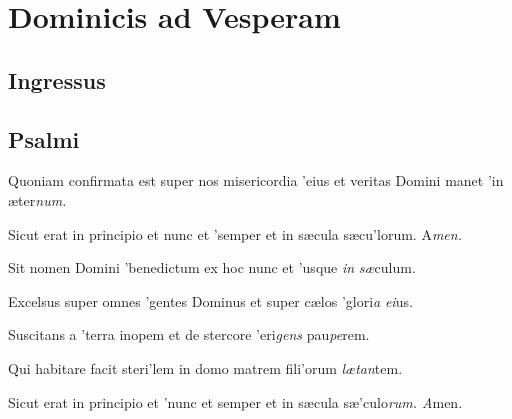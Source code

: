\chapter{Dominicis ad Vesperam}
\def\gebet{\textsc{Vesper (lateinisch)}}
\section*{Ingressus}
\par
{}\enlargethispage{5em}
\newpage
\section*{Psalmi}
\par
\vskip9mm
\begin{multicols}{2}\setlength{\columnseprule}{0.2px}
Quoniam confirmata est super nos misericordia 'eius \grestar{} et veritas Domini manet 'in æter\textit{num.}\par
{}\par
Sicut erat in principio et nunc et 'semper \grestar{} et in sæcula sæcu'lorum. A\textit{men.}\par
\end{multicols}
\vskip6bp
\par
\vskip9mm
\begin{multicols}{2}\setlength{\columnseprule}{0.2px}
Sit nomen Domini 'benedictum \grestar{} ex hoc nunc et 'usque \textit{in} \textit{sæ}culum.\par
{}\par
Excelsus super omnes 'gentes Dominus \grestar{} et super cælos 'glori\textit{a} \textit{ei}us.\par
{}\par
Suscitans a 'terra inopem \grestar{} et de stercore 'eri\textit{gens} pau\textit{pe}rem.\par
{}\par
Qui habitare facit steri'lem in domo \grestar{} matrem fili'orum \textit{lætan}tem.\par
{}\par
Sicut erat in principio et 'nunc et semper \grestar{} et in sæcula sæ'culo\textit{rum. A}men.\par
\end{multicols}
